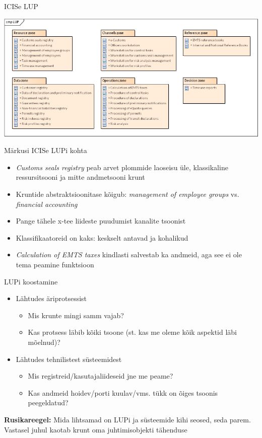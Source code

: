 \documentclass{beamer}
\begin{document}
\begin{frame}{ICISe LUP}
	\begin{center}
		\includegraphics[width=\textwidth]{LUP.png}
	\end{center}
\end{frame}

\begin{frame}{Märkusi ICISe LUPi kohta}
	\begin{itemize}
		\item \emph{Customs seals registry} peab arvet plommide laoseisu üle, klassikaline ressursitsooni ja mitte andmetsooni krunt
		\item Kruntide abstraktsioonitase kõigub: \emph{management of employee groups} vs. \emph{financial accounting}
		\item Pange tähele x-tee liideste puudumist kanalite tsoonist
		\item Klassifikaatoreid on kaks: keskselt antavad ja kohalikud
		\item \emph{Calculation of EMTS taxes} kindlasti salvestab ka andmeid, aga see ei ole tema peamine funktsioon
	\end{itemize}
\end{frame}

\begin{frame}{LUPi koostamine}
	\begin{itemize}
		\item Lähtudes äriprotsessist
		\begin{itemize}
			\item Mis krunte mingi samm vajab? 
			\item Kas protsess läbib kõiki tsoone (st. kas me oleme kõik aspektid läbi mõelnud)?
		\end{itemize}
		\item Lähtudes tehnilistest süsteemidest
		\begin{itemize}
			\item Mis registreid/kasutajaliideseid jne me peame?
			\item Kas andmeid hoidev/porti kuulav/vms. tükk on õiges tsoonis peegeldatud?
		\end{itemize}
	\end{itemize}
	\textbf{Rusikareegel:} Mida lihtsamad on LUPi ja süsteemide kihi seosed, seda parem. Vastasel juhul kaotab krunt oma juhtimisobjekti tähenduse
\end{frame}
\end{document}
